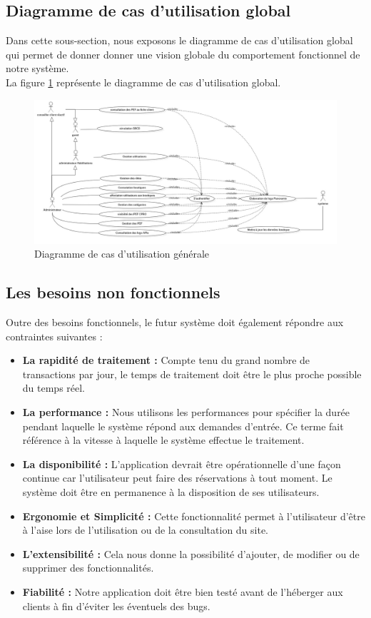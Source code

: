 \subsection[Diagramme de cas d’utilisation global]{Diagramme de cas d’utilisation global}
Dans cette sous-section, nous exposons le diagramme de cas d’utilisation global qui permet de donner donner une vision globale du comportement fonctionnel de notre système.\\
La figure \ref{fig:usecasediagram-global} représente le diagramme de cas d’utilisation global.
\begin{figure}[H]
	\centering
	\includegraphics[width=1\linewidth]{img/conception/usecases/UseCaseDiagram-global}
	\caption[Diagramme de cas d'utilisation générale]{Diagramme de cas d'utilisation générale}
	\label{fig:usecasediagram-global}
\end{figure}
\subsection[Les besoins non fonctionnels]{Les besoins non fonctionnels}
Outre des besoins fonctionnels, le futur système doit également répondre aux contraintes suivantes :
\begin{itemize}
	\item \textbf{La rapidité de traitement :} Compte tenu du grand nombre de transactions par jour, le temps de traitement doit être le plus proche possible du temps réel.
	\item \textbf{La performance :} Nous utilisons les performances pour spécifier la durée pendant laquelle le système répond aux demandes d'entrée. Ce terme fait référence à la vitesse à laquelle le système effectue le traitement.
	\item \textbf{La disponibilité :} L'application devrait être opérationnelle d'une façon continue car l’utilisateur peut faire des réservations à tout moment. Le système doit être en permanence à la disposition de ses utilisateurs.
	\item \textbf{Ergonomie et Simplicité :} Cette fonctionnalité permet à l’utilisateur d’être à l’aise lors de l’utilisation ou de la consultation du site.
	\item \textbf{L’extensibilité :} Cela nous donne la possibilité d’ajouter, de modifier ou de supprimer des fonctionnalités.
	\item \textbf{Fiabilité :} Notre application doit être bien testé avant de l’héberger aux clients à fin d’éviter les éventuels des bugs.
\end{itemize}

